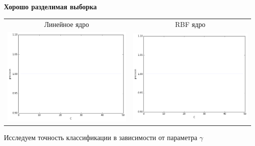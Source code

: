 \documentclass[12pt, a4paper]{article}
\begin{document}
			\begin{center}{\bf Хорошо разделимая выборка}\end{center}

			\begin{center}
			\begin{tabular}{c c}
				Линейное ядро & RBF ядро \\
				\includegraphics[width=8cm]{3par_good_lin_C.png} &
				\includegraphics[width=8cm]{3par_good_rbf_C.png}
			\end{tabular}				
			\end{center}


			Исследуем точность классификации в зависимости от параметра $\gamma$
\end{document}
